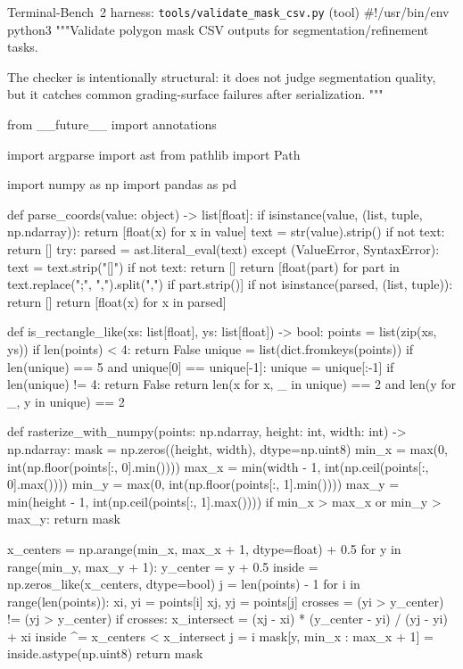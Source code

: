 \begin{promptbox}{Terminal-Bench~2 harness: \texttt{tools/validate\_mask\_csv.py} (tool)}
#!/usr/bin/env python3
"""Validate polygon mask CSV outputs for segmentation/refinement tasks.

The checker is intentionally structural: it does not judge segmentation quality,
but it catches common grading-surface failures after serialization.
"""

from __future__ import annotations

import argparse
import ast
from pathlib import Path

import numpy as np
import pandas as pd


def parse_coords(value: object) -> list[float]:
    if isinstance(value, (list, tuple, np.ndarray)):
        return [float(x) for x in value]
    text = str(value).strip()
    if not text:
        return []
    try:
        parsed = ast.literal_eval(text)
    except (ValueError, SyntaxError):
        text = text.strip("[]")
        if not text:
            return []
        return [float(part) for part in text.replace(";", ",").split(",") if part.strip()]
    if not isinstance(parsed, (list, tuple)):
        return []
    return [float(x) for x in parsed]


def is_rectangle_like(xs: list[float], ys: list[float]) -> bool:
    points = list(zip(xs, ys))
    if len(points) < 4:
        return False
    unique = list(dict.fromkeys(points))
    if len(unique) == 5 and unique[0] == unique[-1]:
        unique = unique[:-1]
    if len(unique) != 4:
        return False
    return len({x for x, _ in unique}) == 2 and len({y for _, y in unique}) == 2


def rasterize_with_numpy(points: np.ndarray, height: int, width: int) -> np.ndarray:
    mask = np.zeros((height, width), dtype=np.uint8)
    min_x = max(0, int(np.floor(points[:, 0].min())))
    max_x = min(width - 1, int(np.ceil(points[:, 0].max())))
    min_y = max(0, int(np.floor(points[:, 1].min())))
    max_y = min(height - 1, int(np.ceil(points[:, 1].max())))
    if min_x > max_x or min_y > max_y:
        return mask

    x_centers = np.arange(min_x, max_x + 1, dtype=float) + 0.5
    for y in range(min_y, max_y + 1):
        y_center = y + 0.5
        inside = np.zeros_like(x_centers, dtype=bool)
        j = len(points) - 1
        for i in range(len(points)):
            xi, yi = points[i]
            xj, yj = points[j]
            crosses = (yi > y_center) != (yj > y_center)
            if crosses:
                x_intersect = (xj - xi) * (y_center - yi) / (yj - yi) + xi
                inside ^= x_centers < x_intersect
            j = i
        mask[y, min_x : max_x + 1] = inside.astype(np.uint8)
    return mask



\end{promptbox}
